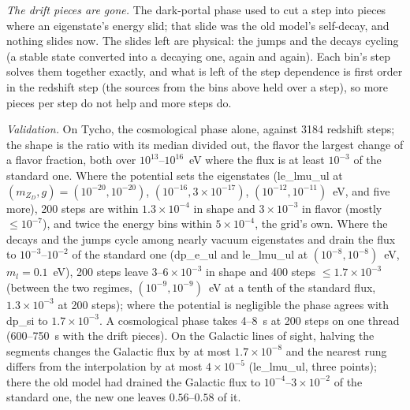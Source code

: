 \documentclass[11pt,a4paper]{article}
\newcommand{\mzd}{m_{Z_D}}
\begin{document}
\emph{The drift pieces are gone.} The dark-portal phase used to cut a step into pieces where an eigenstate's energy
slid; that slide was the old model's self-decay, and nothing slides now. The slides left are physical: the jumps and
the decays cycling (a stable state converted into a decaying one, again and again). Each bin's step solves them
together exactly, and what is left of the step dependence is first order in the redshift step (the sources from the
bins above held over a step), so more pieces per step do not help and more steps do.

\emph{Validation.} On Tycho, the cosmological phase alone, against 3184 redshift steps; the shape is the ratio with
its median divided out, the flavor the largest change of a flavor fraction, both over $10^{13}$--$10^{16}$~eV where the
flux is at least $10^{-3}$ of the standard one. Where the potential sets the eigenstates (le\_lmu\_ul at
$(\mzd, g) = (10^{-20}, 10^{-20})$, $(10^{-16}, 3\times10^{-17})$, $(10^{-12}, 10^{-11})$~eV, and five more), 200
steps are within $1.3\times10^{-4}$ in shape and $3\times10^{-3}$ in flavor (mostly $\le10^{-7}$), and twice the energy
bins within $5\times10^{-4}$, the grid's own. Where the decays and the jumps cycle among nearly vacuum eigenstates and
drain the flux to $10^{-3}$--$10^{-2}$ of the standard one (dp\_e\_ul and le\_lmu\_ul at $(10^{-8}, 10^{-8})$~eV,
$m_l = 0.1$~eV), 200 steps leave $3$--$6\times10^{-3}$ in shape and 400 steps $\le1.7\times10^{-3}$ (between the two
regimes, $(10^{-9}, 10^{-9})$~eV at a tenth of the standard flux, $1.3\times10^{-3}$ at 200 steps); where the potential
is negligible the phase agrees with dp\_si to $1.7\times10^{-3}$. A cosmological phase takes 4--8~s at 200 steps on one
thread (600--750~s with the drift pieces). On the Galactic lines of sight, halving the segments changes the Galactic
flux by at most $1.7\times10^{-8}$ and the nearest rung differs from the interpolation by at most $4\times10^{-5}$
(le\_lmu\_ul, three points); there the old model had drained the Galactic flux to $10^{-4}$--$3\times10^{-2}$ of the
standard one, the new one leaves $0.56$--$0.58$ of it.
\end{document}
